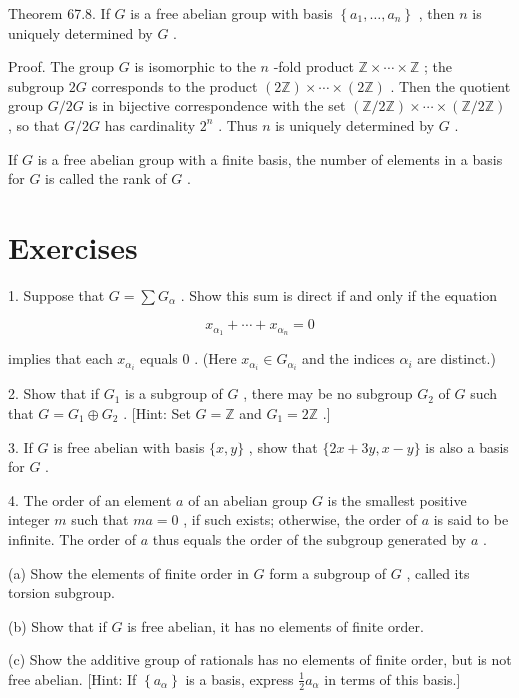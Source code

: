 Theorem 67.8. If \(G\) is a free abelian group with basis \(\left\{  {{a}_{1},\ldots ,{a}_{n}}\right\}\) , then \(n\) is uniquely determined by \(G\) .

Proof. The group \(G\) is isomorphic to the \(n\) -fold product \(\mathbb{Z} \times  \cdots  \times  \mathbb{Z}\) ; the subgroup \({2G}\) corresponds to the product \(\left( {2\mathbb{Z}}\right)  \times  \cdots  \times  \left( {2\mathbb{Z}}\right)\) . Then the quotient group \(G/{2G}\) is in bijective correspondence with the set \(\left( {\mathbb{Z}/2\mathbb{Z}}\right)  \times  \cdots  \times  \left( {\mathbb{Z}/2\mathbb{Z}}\right)\) , so that \(G/{2G}\) has cardinality \({2}^{n}\) . Thus \(n\) is uniquely determined by \(G\) .

If \(G\) is a free abelian group with a finite basis, the number of elements in a basis for \(G\) is called the rank of \(G\) .

\section*{Exercises}

1. Suppose that \(G = \sum {G}_{\alpha }\) . Show this sum is direct if and only if the equation

\[
{x}_{{\alpha }_{1}} + \cdots  + {x}_{{\alpha }_{n}} = 0
\]

implies that each \({x}_{{\alpha }_{i}}\) equals 0 . (Here \({x}_{{\alpha }_{i}} \in  {G}_{{\alpha }_{i}}\) and the indices \({\alpha }_{i}\) are distinct.)

2. Show that if \({G}_{1}\) is a subgroup of \(G\) , there may be no subgroup \({G}_{2}\) of \(G\) such that \(G = {G}_{1} \oplus  {G}_{2}\) . [Hint: Set \(G = \mathbb{Z}\) and \({G}_{1} = 2\mathbb{Z}\) .]

3. If \(G\) is free abelian with basis \(\{ x,y\}\) , show that \(\{ {2x} + {3y},x - y\}\) is also a basis for \(G\) .

4. The order of an element \(a\) of an abelian group \(G\) is the smallest positive integer \(m\) such that \({ma} = 0\) , if such exists; otherwise, the order of \(a\) is said to be infinite. The order of \(a\) thus equals the order of the subgroup generated by \(a\) .

(a) Show the elements of finite order in \(G\) form a subgroup of \(G\) , called its torsion subgroup.

(b) Show that if \(G\) is free abelian, it has no elements of finite order.

(c) Show the additive group of rationals has no elements of finite order, but is not free abelian. [Hint: If \(\left\{  {a}_{\alpha }\right\}\) is a basis, express \(\frac{1}{2}{a}_{\alpha }\) in terms of this basis.]

